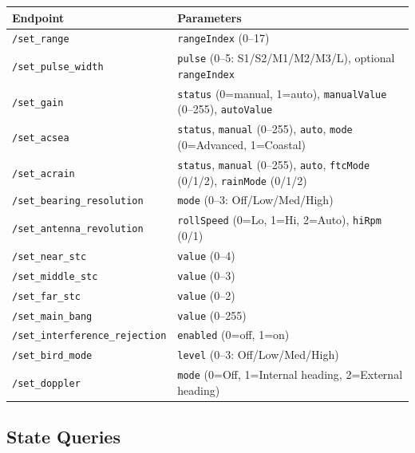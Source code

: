 \documentclass[11pt,letterpaper]{article}
\begin{document}
\begin{longtable}{l p{9cm}}
\toprule
\textbf{Endpoint} & \textbf{Parameters} \\
\midrule
\texttt{/set\_range} & \texttt{rangeIndex} (0--17) \\
\texttt{/set\_pulse\_width} & \texttt{pulse} (0--5: S1/S2/M1/M2/M3/L), optional \texttt{rangeIndex} \\
\texttt{/set\_gain} & \texttt{status} (0=manual, 1=auto), \texttt{manualValue} (0--255), \texttt{autoValue} \\
\texttt{/set\_acsea} & \texttt{status}, \texttt{manual} (0--255), \texttt{auto}, \texttt{mode} (0=Advanced, 1=Coastal) \\
\texttt{/set\_acrain} & \texttt{status}, \texttt{manual} (0--255), \texttt{auto}, \texttt{ftcMode} (0/1/2), \texttt{rainMode} (0/1/2) \\
\texttt{/set\_bearing\_resolution} & \texttt{mode} (0--3: Off/Low/Med/High) \\
\texttt{/set\_antenna\_revolution} & \texttt{rollSpeed} (0=Lo, 1=Hi, 2=Auto), \texttt{hiRpm} (0/1) \\
\texttt{/set\_near\_stc} & \texttt{value} (0--4) \\
\texttt{/set\_middle\_stc} & \texttt{value} (0--3) \\
\texttt{/set\_far\_stc} & \texttt{value} (0--2) \\
\texttt{/set\_main\_bang} & \texttt{value} (0--255) \\
\texttt{/set\_interference\_rejection} & \texttt{enabled} (0=off, 1=on) \\
\texttt{/set\_bird\_mode} & \texttt{level} (0--3: Off/Low/Med/High) \\
\texttt{/set\_doppler} & \texttt{mode} (0=Off, 1=Internal heading, 2=External heading) \\
\bottomrule
\end{longtable}

\subsection{State Queries}
\label{subsec:api-state}
\end{document}
